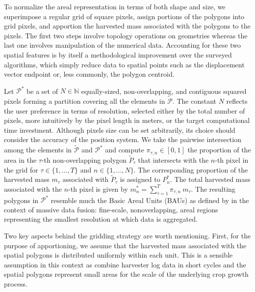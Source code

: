 \documentclass[12pt]{article}
\begin{document}
To normalize the areal representation in terms of both shape and size,
we superimpose a regular grid of square pixels, assign portions of the
polygons into grid pixels, and apportion the harvested mass associated
with the polygons to the pixels. The first two steps involve topology
operations on geometries whereas the last one involves manipulation of
the numerical data. Accounting for these two spatial features is by
itself a methodological improvement over the surveyed algorithms,
which simply reduce data to spatial points such as the displacement
vector endpoint or, less commonly, the polygon centroid.

Let $\mathcal{P}^{*}$ be
a set of $N \in \mathbb{N}$ equally-sized, non-overlapping, and
contiguous squared pixels forming a partition covering all the
elements in $\tilde{\mathcal{P}}$. The constant $N$ reflects the user
preference in terms of resolution, selected either by the total number
of pixels, more intuitively by the pixel length in meters, or the
target computational time investment. Although pixels size can be set
arbitrarily, its choice should consider the accuracy of the position
system. We take the pairwise intersection among the elements in
$\tilde{\mathcal{P}}$ and $\mathcal{P}^{*}$ and compute
$\pi_{\tau, n} \in [0, 1]$ the proportion of the area in the $\tau$-th
non-overlapping polygon $\tilde{P}_{\tau}$ that intersects with the
$n$-th pixel in the grid for $\tau \in \{1, \dots, T\}$ and
$n \in \{1, \dots, N\}$. The corresponding proportion of the harvested
mass $m_{\tau}$ associated with $\tilde{P}_{\tau}$ is assigned to
$P^{*}_n$. The total harvested mass associated with the $n$-th pixel
is given by $m^{*}_n = \sum_{\tau = 1}^{T} \pi_{\tau, n} \
m_{\tau}$. The resulting polygons in $\mathcal{P}^{*}$ resemble much
the Basic Areal Units (BAUs) as defined by \cite{Nguyen2012} in the
context of massive data fusion: fine-scale, nonoverlapping, areal
regions representing the smallest resolution at which data is
aggregated.

Two key aspects behind the
gridding strategy are worth mentioning. First, for the purpose of
apportioning, we assume that the harvested mass associated with the
spatial polygons is distributed uniformly within each unit. This is a
sensible assumption in this context as combine harvester log data in
short cycles and the spatial polygons represent small areas for the
scale of the underlying crop growth process.
\end{document}
